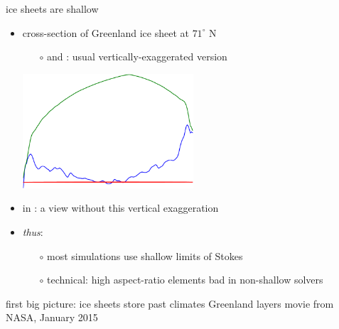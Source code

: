 \documentclass[hide notes,intlimits]{beamer}
\begin{document}
\begin{frame}{ice sheets are shallow}

\begin{itemize}
\item cross-section of Greenland ice sheet at $71^\circ$ N
\small
  \begin{itemize}
  \item[$\circ$] {\color{dark green}{green}} and {\color{dark blue}{blue}}: usual vertically-exaggerated version
  \end{itemize}
  \begin{center}
    \includegraphics[width=0.5\textwidth]{newgreentrans}
  \end{center}
\normalsize
\item in {\color{dark red}{red}}: a view without this vertical exaggeration
\item \emph{thus}: 
  \begin{itemize}
  \item[$\circ$] most simulations use shallow limits of Stokes
  \item[$\circ$] \scriptsize technical: high aspect-ratio elements bad in non-shallow solvers
  \end{itemize}
\end{itemize}
\end{frame}


\begin{frame}{first big picture: ice sheets store past climates}
Greenland layers movie from NASA, January 2015
\end{frame}
\end{document}
